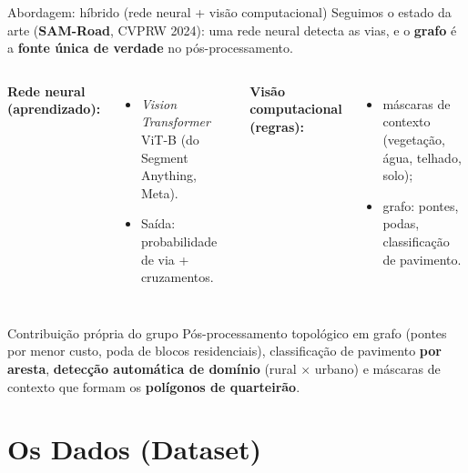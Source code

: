 \documentclass{beamer}
\begin{document}
\begin{frame}{Abordagem: híbrido (rede neural + visão computacional)}
    \footnotesize
    Seguimos o estado da arte (\textbf{SAM-Road}, CVPRW 2024): uma rede neural detecta as vias, e o \textbf{grafo} é a \textbf{fonte única de verdade} no pós-processamento.
    \vspace{0.15cm}
    \begin{columns}
        \textbf{Rede neural (aprendizado):}
        \begin{itemize}\footnotesize
            \item \textit{Vision Transformer} ViT-B (do Segment Anything, Meta).
            \item Saída: probabilidade de via + cruzamentos.
        \end{itemize}
        \textbf{Visão computacional (regras):}
        \begin{itemize}\footnotesize
            \item máscaras de contexto (vegetação, água, telhado, solo);
            \item grafo: pontes, podas, classificação de pavimento.
        \end{itemize}
    \end{columns}
    \vspace{0.15cm}
    \begin{block}{Contribuição própria do grupo}
        \footnotesize Pós-processamento topológico em grafo (pontes por menor custo, poda de blocos residenciais), classificação de pavimento \textbf{por aresta}, \textbf{detecção automática de domínio} (rural $\times$ urbano) e máscaras de contexto que formam os \textbf{polígonos de quarteirão}.
    \end{block}
\end{frame}

\section{Os Dados (Dataset)}
\end{document}
